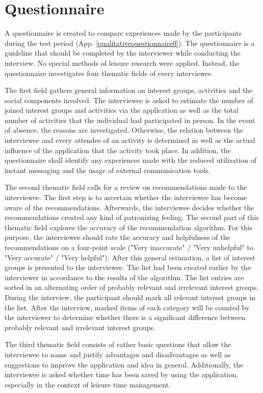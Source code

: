 \documentclass[12pt,numbers=noenddot,parskip,bibliography=totocnumbered,listof=totocnumbered,draft]{scrreprt}
\begin{document}
\section{Questionnaire}
A questionnaire is created to compare experiences made by the participants during the test period (App. \ref{qualitativequestionnaire0}). The questionnaire is a guideline that should be completed by the interviewer while conducting the interview. No special methods of leisure research were applied. Instead, the questionnaire investigates four thematic fields of every interviewee.

The first field gathers general information on interest groups, activities and the social components involved. The interviewee is asked to estimate the number of joined interest groups and activities via the application as well as the total number of activities that the individual had participated in person. In the event of absence, the reasons are investigated. Otherwise, the relation between the interviewee and every attendee of an activity is determined as well as the actual influence of the application that the activity took place. In addition, the questionnaire shall identify any experiences made with the reduced utilization of instant messaging and the usage of external communication tools.

The second thematic field calls for a review on recommendations made to the interviewee. The first step is to ascertain whether the interviewee has become aware of the recommendations. Afterwards, the interviewee decides whether the recommendations created any kind of patronizing feeling. The second part of this thematic field explores the accuracy of the recommendation algorithm. For this purpose, the interviewee should rate the accuracy and helpfulness of the recommendations on a four-point scale ("Very inaccurate" / "Very unhelpful" to "Very accurate" / "Very helpful"). After this general estimation, a list of interest groups is presented to the interviewee. The list had been created earlier by the interviewer in accordance to the results of the algorithm. The list entries are sorted in an alternating order of probably relevant and irrelevant interest groups. During the interview, the participant should mark all relevant interest groups in the list. After the interview, marked items of each category will be counted by the interviewer to determine whether there is a significant difference between probably relevant and irrelevant interest groups.

The third thematic field consists of rather basic questions that allow the interviewee to name and justify advantages and disadvantages as well as suggestions to improve the application and idea in general. Additionally, the interviewee is asked whether time has been saved by using the application, especially in the context of leisure time management.
\end{document}
